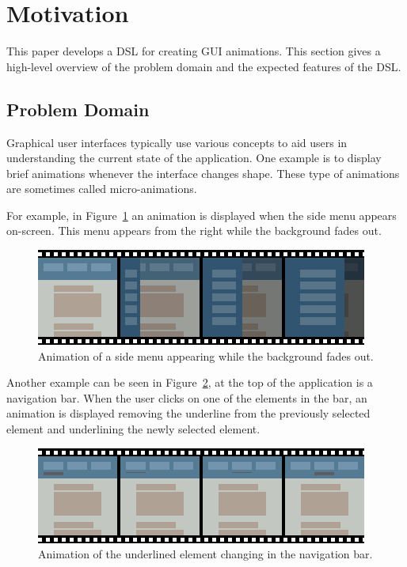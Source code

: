 \section{Motivation}
\label{sec:motivation}

This paper develops a DSL for creating GUI animations. This section gives a high-level overview of the problem domain and the expected features of the DSL.

\subsection{Problem Domain}

Graphical user interfaces typically use various concepts to aid users in understanding the current state of the application. One example is to display brief animations whenever the interface changes shape. These type of animations are sometimes called micro-animations.

For example, in Figure~\ref{fig:usecase1} an animation is displayed when the side menu appears on-screen. This menu appears from the right while the background fades out.

\begin{figure}[h]
\centering
\includegraphics[width=\figscale\textwidth]{pictures/usecase1fig}
\caption{Animation of a side menu appearing while the background fades out.}
\label{fig:usecase1}
\end{figure}

Another example can be seen in Figure~\ref{fig:usecase2}, at the top of the application is a navigation bar. When the user clicks on one of the elements in the bar, an animation is displayed removing the underline from the previously selected element and underlining the newly selected element.

\begin{figure}[h]
\centering
\includegraphics[width=\figscale\textwidth]{pictures/usecase2fig}
\caption{Animation of the underlined element changing in the navigation bar.}
\label{fig:usecase2}
\end{figure}


